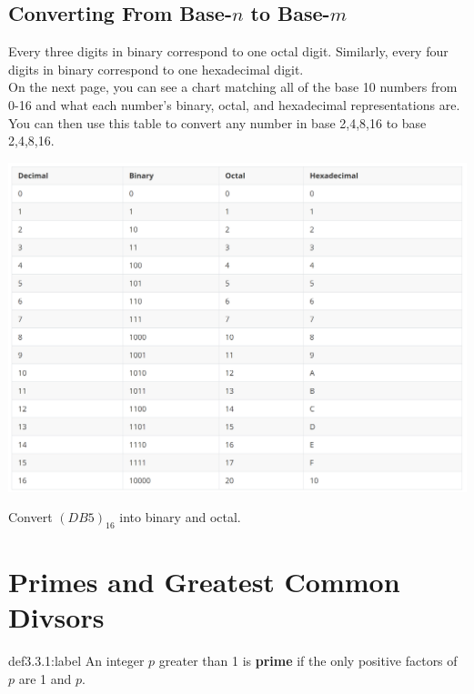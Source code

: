 \subsection{Converting From Base-$n$ to Base-$m$}

Every three digits in binary correspond to one octal digit. Similarly, every four digits in binary correspond to one hexadecimal digit.\\

On the next page, you can see a chart matching all of the base 10 numbers from 0-16 and what each number's binary, octal, and hexadecimal representations are. You can then use this table to convert any number in base 2,4,8,16 to base 2,4,8,16.\newpage

\begin{center}
    \includegraphics[width=1.2\textwidth]{chapters/ch3/images/Number_Chart.PNG}
\end{center}

\begin{problem}
    Convert $(DB5)_{16}$ into binary and octal.
\end{problem}


\section{Primes and Greatest Common Divsors}

\begin{definition}{def3.3.1:label}
    An integer $p$ greater than 1 is \textbf{prime} if the only positive factors of $p$ are 1 and $p$.
\end{definition}

